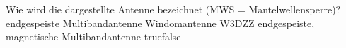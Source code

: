     {Wie wird die dargestellte Antenne bezeichnet (MWS = Mantelwellensperre)?}
    {endgespeiste Multibandantenne}
    {Windomantenne}
    {W3DZZ}
    {endgespeiste, magnetische Multibandantenne}
    {true}{false}